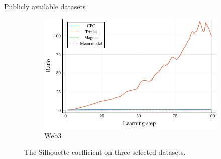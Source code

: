 \documentclass[10pt]{beamer}
\begin{document}
\begin{frame}{Publicly available datasets}
\begin{figure}
\begin{subfigure}[t]{0.38\textwidth}
			\centering
			\includegraphics[width=\textwidth]{images/Web3_ratio/Web3_ratio.pdf}
			\caption{Web3}
		\end{subfigure}
		\caption{The Silhouette coefficient on three selected datasets.}
	\end{figure}
\end{frame}
\end{document}
